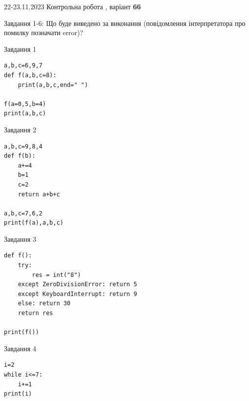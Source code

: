 \documentclass[12pt, ukrainian]{article}
\begin{document}
{{22-23.11.2023 Контрольна робота , варіант  \No \textbf { 66 }\par}}
{

Завдання 1-6: Що буде виведено за виконання (повідомлення інтерпретатора про помилку позначати error)?


\begin{minipage}[t]{9.7cm}                
{\begin{center}Завдання {1}\end{center}}
\begin{verbatim}
a,b,c=6,9,7
def f(a,b,c=8):
    print(a,b,c,end=" ")

f(a=0,5,b=4)
print(a,b,c)
\end{verbatim}     
\end{minipage}
\vline \hspace{8mm}
\begin{minipage}[t]{8.0cm}                
{\begin{center}Завдання {2}\end{center}}
\begin{verbatim}
a,b,c=9,8,4
def f(b):
    a+=4
    b=1
    c=2
    return a+b+c

a,b,c=7,6,2
print(f(a),a,b,c)
\end{verbatim}     
\end{minipage}

\vspace{15mm}
\begin{minipage}[t]{9.7cm}                
{\begin{center}Завдання {3}\end{center}}
\begin{verbatim}
def f():
    try:
        res = int("8")
    except ZeroDivisionError: return 5
    except KeyboardInterrupt: return 9
    else: return 30
    return res

print(f())
\end{verbatim}     
\end{minipage}
\vline \hspace{8mm}
\begin{minipage}[t]{8.0cm}                
{\begin{center}Завдання {4}\end{center}}
\begin{verbatim}
i=2
while i<=7:
    i+=1
print(i)
\end{verbatim}     
\end{minipage}

}
\end{document}
